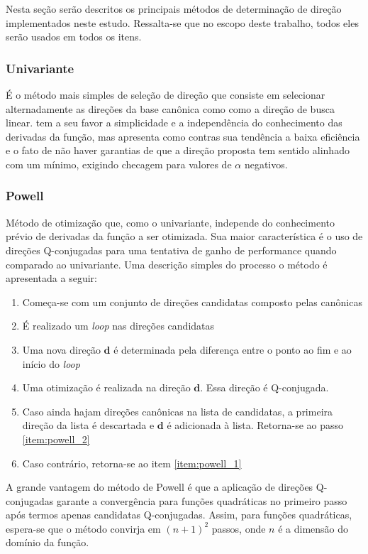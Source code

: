 \documentclass[10pt, a4paper]{article}
\begin{document}
Nesta seção serão descritos os principais métodos de determinação de direção implementados neste estudo. Ressalta-se que no 
escopo deste trabalho, todos eles serão usados em todos os itens.

\subsubsection{Univariante}

É o método mais simples de seleção de direção que consiste em selecionar alternadamente as direções da base canônica como
como a direção de busca linear. tem a seu favor a simplicidade e a independência do conhecimento das derivadas da função,
mas apresenta como contras sua tendência a baixa eficiência e o fato de não haver garantias de que a direção proposta tem
sentido alinhado com um mínimo, exigindo checagem para valores de $\alpha$ negativos.

\subsubsection{Powell}

Método de otimização que, como o univariante, independe do conhecimento prévio de derivadas da função a ser otimizada. Sua
maior característica é o uso de direções Q-conjugadas para uma tentativa de ganho de performance quando comparado ao
univariante. Uma descrição simples do processo o método é apresentada a seguir:

\begin{enumerate}
  \item Começa-se com um conjunto de direções candidatas composto pelas canônicas\label{item:powell_1}
  \item É realizado um \textit{loop} nas direções candidatas\label{item:powell_2}
  \item Uma nova direção $\mathbf{d}$ é determinada pela diferença entre o ponto ao fim e ao início do \textit{loop}
  \item Uma otimização é realizada na direção $\mathbf{d}$. Essa direção é Q-conjugada.
  \item Caso ainda hajam direções canônicas na lista de candidatas, a primeira direção da lista é descartada e $\mathbf{d}$ é adicionada à lista. Retorna-se ao passo \ref{item:powell_2}
  \item Caso contrário, retorna-se ao item \ref{item:powell_1}
\end{enumerate}

A grande vantagem do método de Powell é que a aplicação de direções Q-conjugadas garante a convergência para funções quadráticas
no primeiro passo após termos apenas candidatas Q-conjugadas. Assim, para funções quadráticas, espera-se que o método convirja em
$(n+1)^2$ passos, onde $n$ é a dimensão do domínio da função.
\end{document}
